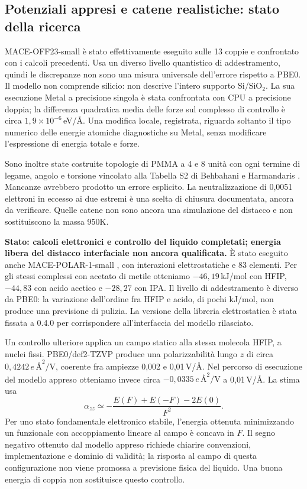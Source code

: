 \documentclass[11pt,reqno]{amsart}
\numberwithin{equation}{section}
\newcommand{\SiO}{\ensuremath{\mathrm{SiO}_2}}
\begin{document}
\subsection{Potenziali appresi e catene realistiche: stato della ricerca}

MACE-OFF23-small \cite{MACE2025} \`e stato effettivamente eseguito
sulle 13 coppie e confrontato con i calcoli precedenti. Usa un diverso
livello quantistico di addestramento, quindi le discrepanze non sono
una misura universale dell'errore rispetto a PBE0. Il modello non
comprende silicio: non descrive l'intero supporto Si/\SiO.
La sua esecuzione Metal a precisione singola \`e stata confrontata
con CPU a precisione doppia; la differenza quadratica media delle
forze sul complesso di controllo \`e circa
$1,9\times10^{-6}$\,eV/\AA. Una modifica locale, registrata,
riguarda soltanto il tipo numerico delle energie atomiche diagnostiche
su Metal, senza modificare l'espressione di energia totale e forze.

Sono inoltre state costruite topologie di PMMA a 4 e 8 unit\`a con
ogni termine di legame, angolo e torsione vincolato alla Tabella S2
di Behbahani e Harmandaris \cite{Behbahani2021}. Mancanze avrebbero
prodotto un errore esplicito. La neutralizzazione di 0,0051 elettroni
in eccesso ai due estremi \`e una scelta di chiusura documentata,
ancora da verificare. Quelle catene non sono ancora una simulazione
del distacco e non sostituiscono la massa 950K.

\textbf{Stato: calcoli elettronici e controllo del liquido completati;
energia libera del distacco interfaciale non ancora qualificata.}
\`E stato eseguito anche MACE-POLAR-1-small \cite{MACEPolar2026},
con interazioni elettrostatiche e 83 elementi. Per gli stessi complessi
con acetato di metile otteniamo $-46{,}19$\,kJ/mol con HFIP,
$-44{,}83$ con acido acetico e $-28{,}27$ con IPA. Il livello di
addestramento \`e diverso da PBE0: la variazione dell'ordine fra
HFIP e acido, di pochi kJ/mol, non produce una previsione di pulizia.
La versione della libreria elettrostatica \`e stata fissata a 0.4.0
per corrispondere all'interfaccia del modello rilasciato.

Un controllo ulteriore applica un campo statico alla stessa molecola
HFIP, a nuclei fissi. PBE0/def2-TZVP produce una polarizzabilit\`a
lungo $z$ di circa $0{,}4242\,e\,\text{\AA}^2/\mathrm V$, coerente fra
ampiezze 0,002 e 0,01\,V/\AA. Nel percorso di esecuzione del
modello appreso otteniamo invece circa $-0{,}0335\,e\,\text{\AA}^2/\mathrm V$
a 0,01\,V/\AA. La stima usa
\begin{equation}
 \alpha_{zz}\simeq -\frac{E(F)+E(-F)-2E(0)}{F^2}.
\end{equation}
Per uno stato fondamentale elettronico stabile, l'energia ottenuta
minimizzando un funzionale con accoppiamento lineare al campo \`e
concava in $F$. Il segno negativo ottenuto dal modello appreso
richiede chiarire convenzioni, implementazione e dominio di validit\`a;
la risposta al campo di questa configurazione non viene promossa a
previsione fisica del liquido. Una buona energia di coppia non
sostituisce questo controllo.
\end{document}
